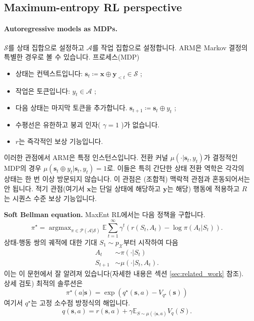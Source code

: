 \documentclass{article}
\def\s{{\bm{s}}}
\def\x{{\bm{x}}}
\def\y{{\bm{y}}}
\def\EE{{\mathbb{E}}}
\def\cA{{\mathcal{A}}}
\def\cP{{\mathcal{P}}}
\def\cS{{\mathcal{S}}}
\def\cX{{\mathcal{X}}}
\def\augvoc{\cA}
\DeclareMathOperator*{\argmax}{argmax}
\begin{document}
\subsection{Maximum-entropy RL perspective} 
 \label{sec:maxent_rl_perspective}

\paragraph{Autoregressive models as MDPs.}

$\cS$를 상태 집합으로 설정하고 $\cA$를 작업 집합으로 설정합니다.
ARM은 Markov 결정의 특별한 경우로 볼 수 있습니다.
프로세스(MDP)
 \begin{itemize} [topsep=0pt,itemsep=3pt,parsep=3pt,leftmargin=16pt]
 \item 상태는 컨텍스트입니다: $\s_t \coloneqq \x \oplus \y_{<t} \in \cS$ ;
 \item 작업은 토큰입니다: $y_t \in \augvoc$ ;
 \item 다음 상태는 마지막 토큰을 추가합니다.
     $\s_{t+1} \coloneqq \s_t \oplus y_t$ ;
 \item 수평선은 유한하고 붕괴 인자( $\gamma = 1$ )가 없습니다.
 \item $r$는 즉각적인 보상 기능입니다.
 \end{itemize} 
이러한 관점에서 ARM은 특정 인스턴스입니다.
전환 커널 $\mu(\cdot|\s_t, y_t)$가 결정적인 MDP의 경우
$\mu(\s_t \oplus y_t|\s_t, y_t) = 1$로.  이들은 특히
간단한 상태 전환 역학은 각각의
상태는 한 번 이상 방문되지 않습니다. 
이 관점은 (조합적) 맥락적 관점과 혼동되어서는 안 됩니다.
적기 관점(여기서 $\x$는 단일 상태에 해당하고 $\y$는 해당)
행동에 적용하고 $R$는 시퀀스 수준 보상 기능입니다.

\textbf{Soft Bellman equation.} MaxEnt RL에서는 다음 정책을 구합니다.
 \begin{equation} 
 \pi ^ \star = \argmax _{ \pi \in \cP ( \cA | \cS )}    
 \EE \sum _{t=1}^ \infty \gamma ^t (r(S_t, A_t) - \log \pi (A_t | S_t)).
 \label{eq:policy_gradient_objective} 
 \end{equation} 
상태-행동 쌍의 궤적에 대한 기대 
$S_1 \sim p_\cX$부터 시작하여 다음
 \begin{align} 
A_t & \sim \pi ( \cdot | S_t) \\
S_{t+1} & \sim \mu ( \cdot | S_t, A_t).
 \end{align} 
이는 이 문헌에서 잘 알려져 있습니다(자세한 내용은 섹션 \ref{sec:related_work} 참조).
상세 검토) 최적의 솔루션은
 \begin{equation} 
 \pi ^ \star (a| \s ) = \exp (q^ \star ( \s , a) - V_{q^ \star }( \s ))
 \end{equation} 
여기서 $q^\star$는 고정 소수점 방정식의 해입니다.
 \begin{equation} 
q( \s , a) = r( \s , a) + \gamma \EE _{S \sim \mu ( \cdot | \s , a)} V_{q}(S).
 \label{eq:soft_q_learning_objective} 
 \end{equation}
\end{document}
